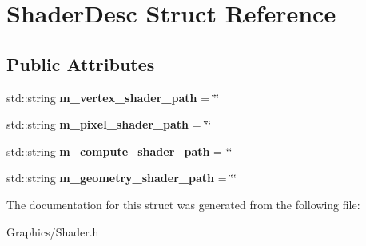 \hypertarget{structShaderDesc}{}\section{Shader\+Desc Struct Reference}
\label{structShaderDesc}
\subsection*{Public Attributes}
\begin{DoxyCompactItemize}
\item 
\mbox{\label{structShaderDesc_a52a0a6c94886a82fd06b4d1b00162bca}} 
std\+::string {\bfseries m\+\_\+vertex\+\_\+shader\+\_\+path} = \char`\"{}\char`\"{}
\item 
\mbox{\label{structShaderDesc_a7a70612c791d8aa07aef71f4c319a5b5}} 
std\+::string {\bfseries m\+\_\+pixel\+\_\+shader\+\_\+path} = \char`\"{}\char`\"{}
\item 
\mbox{\label{structShaderDesc_a2159857fe070bb38b42d95cfa0922386}} 
std\+::string {\bfseries m\+\_\+compute\+\_\+shader\+\_\+path} = \char`\"{}\char`\"{}
\item 
\mbox{\label{structShaderDesc_ad8f45bbd0a2a9510f314df12abec81ea}} 
std\+::string {\bfseries m\+\_\+geometry\+\_\+shader\+\_\+path} = \char`\"{}\char`\"{}
\end{DoxyCompactItemize}


The documentation for this struct was generated from the following file\+:\begin{DoxyCompactItemize}
\item 
Graphics/Shader.\+h\end{DoxyCompactItemize}
